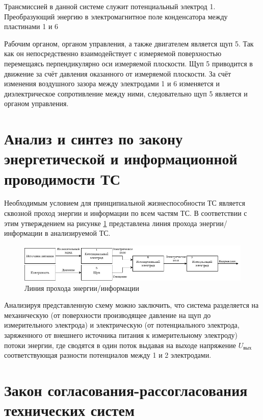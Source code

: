Трансмиссией в данной системе служит потенциальный электрод 1. Преобразующий энергию в электромагнитное поле конденсатора между пластинами 1 и 6

Рабочим органом, органом управления, а также двигателем является щуп 5. Так как он непосредственно взаимодействует с измеряемой поверхностью перемещаясь перпендикулярно оси измеряемой плоскости. Щуп 5 приводится в движение за счёт давления оказанного от измеряемой плоскости. За счёт изменения воздушного зазора между электродами 1 и 6 изменяется и диэлектрическое сопротивление между ними, следовательно щуп 5 является и органом управления.

\section{Анализ и синтез по закону энергетической и информационной проводимости ТС}

Необходимым условием для принципиальной жизнеспособности ТС является сквозной проход энергии и информации по всем частям ТС. В соответствии с этим утверждением на рисунке \ref{fig:process} представлена линия прохода энергии/информации в анализируемой ТС.

\begin{figure}
    \centering
    \includegraphics[width=\textwidth]{graphics/img/process_scheme.png}
    \caption{Линия прохода энергии/информации}
    \label{fig:process}
\end{figure}

Анализируя представленную схему можно заключить, что система разделяется на механическую (от поверхности производящее давление на щуп до измерительного электрода) и электрическую (от потенциального электрода, заряженного от внешнего источника питания к измерительному электроду) потоки энергии, где сводятся в один поток выдавая на выходе напряжение $U_{\text{вых}}$ соответствующая разности потенциалов между 1 и 2 электродами.

\section{Закон согласования-рассогласования технических систем}

